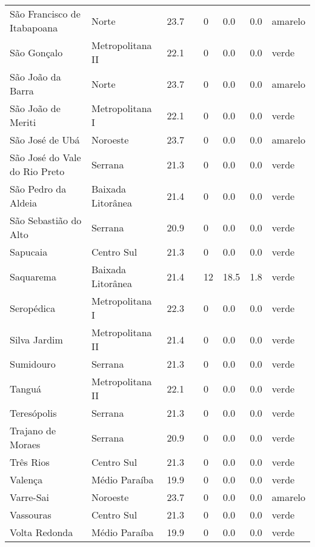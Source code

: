 \begin{longtable}{l|lllllll}
  São Francisco de Itabapoana & Norte & 23.7 &  & 0 & 0.0 & 0.0 & amarelo \\ 
  São Gonçalo & Metropolitana II & 22.1 &  & 0 & 0.0 & 0.0 & verde \\ 
  São João da Barra & Norte & 23.7 &  & 0 & 0.0 & 0.0 & amarelo \\ 
  São João de Meriti & Metropolitana I & 22.1 &  & 0 & 0.0 & 0.0 & verde \\ 
  São José de Ubá & Noroeste & 23.7 &  & 0 & 0.0 & 0.0 & amarelo \\ 
  São José do Vale do Rio Preto & Serrana & 21.3 &  & 0 & 0.0 & 0.0 & verde \\ 
  São Pedro da Aldeia & Baixada Litorânea & 21.4 &  & 0 & 0.0 & 0.0 & verde \\ 
  São Sebastião do Alto & Serrana & 20.9 &  & 0 & 0.0 & 0.0 & verde \\ 
  Sapucaia & Centro Sul & 21.3 &  & 0 & 0.0 & 0.0 & verde \\ 
  Saquarema & Baixada Litorânea & 21.4 &  & 12 & 18.5 & 1.8 & verde \\ 
  Seropédica & Metropolitana I & 22.3 &  & 0 & 0.0 & 0.0 & verde \\ 
  Silva Jardim & Metropolitana II & 21.4 &  & 0 & 0.0 & 0.0 & verde \\ 
  Sumidouro & Serrana & 21.3 &  & 0 & 0.0 & 0.0 & verde \\ 
  Tanguá & Metropolitana II & 22.1 &  & 0 & 0.0 & 0.0 & verde \\ 
  Teresópolis & Serrana & 21.3 &  & 0 & 0.0 & 0.0 & verde \\ 
  Trajano de Moraes & Serrana & 20.9 &  & 0 & 0.0 & 0.0 & verde \\ 
  Três Rios & Centro Sul & 21.3 &  & 0 & 0.0 & 0.0 & verde \\ 
  Valença & Médio Paraíba & 19.9 &  & 0 & 0.0 & 0.0 & verde \\ 
  Varre-Sai & Noroeste & 23.7 &  & 0 & 0.0 & 0.0 & amarelo \\ 
  Vassouras & Centro Sul & 21.3 &  & 0 & 0.0 & 0.0 & verde \\ 
  Volta Redonda & Médio Paraíba & 19.9 &  & 0 & 0.0 & 0.0 & verde \\ 
  \hline
\end{longtable}
